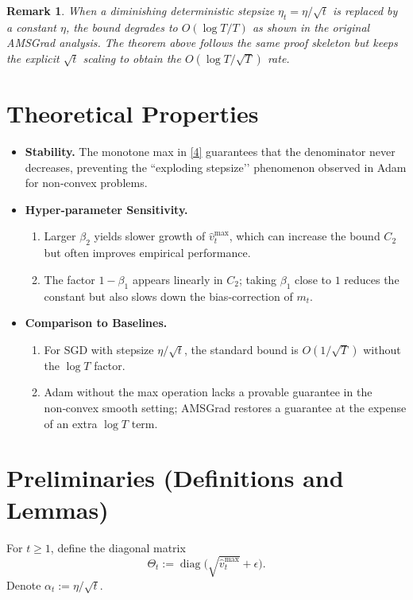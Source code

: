 \documentclass{article}
\newtheorem{remark}{Remark}
\begin{document}
\begin{remark}
When a diminishing deterministic stepsize $\eta_t=\eta/\sqrt{t}$ is replaced by a constant $\eta$, the bound degrades to $O(\log T/T)$ as shown in the original AMSGrad analysis. The theorem above follows the same proof skeleton but keeps the explicit $\sqrt{t}$ scaling to obtain the $O(\log T/\sqrt{T})$ rate.
\end{remark}

\section*{Theoretical Properties}
\begin{itemize}[leftmargin=*]
\item \textbf{Stability.} The monotone max in \eqref{4} guarantees that the denominator never decreases, preventing the “exploding stepsize’’ phenomenon observed in Adam for non‑convex problems.
\item \textbf{Hyper‑parameter Sensitivity.}
    \begin{enumerate}
        \item Larger $\beta_2$ yields slower growth of $\widehat v_t^{\text{max}}$, which can increase the bound $C_2$ but often improves empirical performance.
        \item The factor $1-\beta_1$ appears linearly in $C_2$; taking $\beta_1$ close to $1$ reduces the constant but also slows down the bias‑correction of $m_t$.
    \end{enumerate}
\item \textbf{Comparison to Baselines.}
    \begin{enumerate}
        \item For SGD with stepsize $\eta/\sqrt{t}$, the standard bound is $O(1/\sqrt{T})$ without the $\log T$ factor.
        \item Adam without the max operation lacks a provable guarantee in the non‑convex smooth setting; AMSGrad restores a guarantee at the expense of an extra $\log T$ term.
    \end{enumerate}
\end{itemize}

\section*{Preliminaries (Definitions and Lemmas)}
For $t\ge1$, define the diagonal matrix
\[
\Theta_t := \operatorname{diag}\!\big(\sqrt{\widehat v_t^{\text{max}}}+\epsilon\big).
\]
Denote $\alpha_t:=\eta/\sqrt{t}$.
\end{document}
